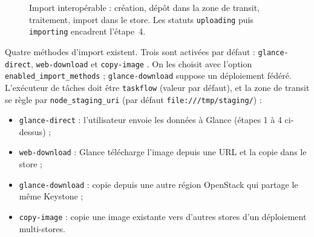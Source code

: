 \begin{figure}[!ht]
\centering
{}
\caption{Import interopérable : création, dépôt dans la zone de transit, traitement, import dans le store. Les statuts
\texttt{uploading} puis \texttt{importing} encadrent l'étape~4.}
\label{fig:gl-import}
\end{figure}

Quatre méthodes d'import existent. Trois sont activées par défaut : \texttt{glance-direct}, \texttt{web-download}
et \texttt{copy-image} \parencite{glance-config}. On les choisit avec l'option \texttt{enabled\_\allowbreak import\_\allowbreak methods} ;
\texttt{glance-download} suppose un déploiement fédéré. L'exécuteur de tâches doit être \texttt{taskflow} (valeur
par défaut), et la zone de transit se règle par \texttt{node\_staging\_uri}
(par défaut \texttt{file:///tmp/staging/}) \parencite{glance-import} :

\begin{itemize}
  \item \texttt{glance-direct} : l'utilisateur envoie les données à Glance (étapes 1 à 4 ci-dessus) ;
  \item \texttt{web-download} : Glance télécharge l'image depuis une URL et la copie dans le store ;
  \item \texttt{glance-download} : copie depuis une autre région OpenStack qui partage le même Keystone ;
  \item \texttt{copy-image} : copie une image existante vers d'autres stores d'un déploiement multi-stores.
\end{itemize}

